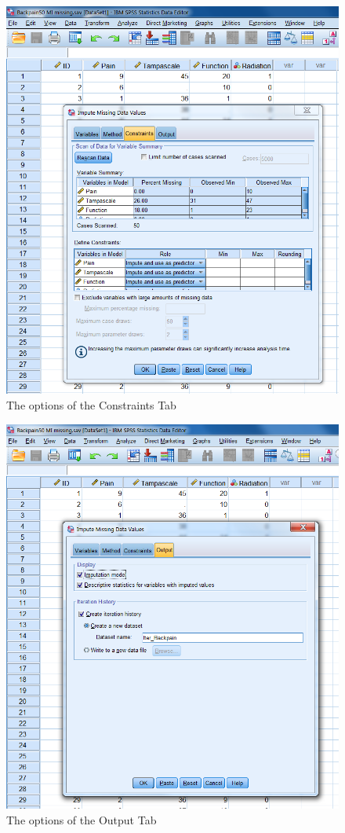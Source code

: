 \documentclass[
]{book}
\begin{document}
\begin{figure}

{\centering \includegraphics[width=0.9\linewidth]{images/fig8.3} 

}

\caption{The options of the Constraints Tab}\label{fig:fig8-3}
\end{figure}

\begin{figure}

{\centering \includegraphics[width=0.9\linewidth]{images/fig8.4} 

}

\caption{The options of the Output Tab}\label{fig:fig8-4}
\end{figure}
\end{document}
